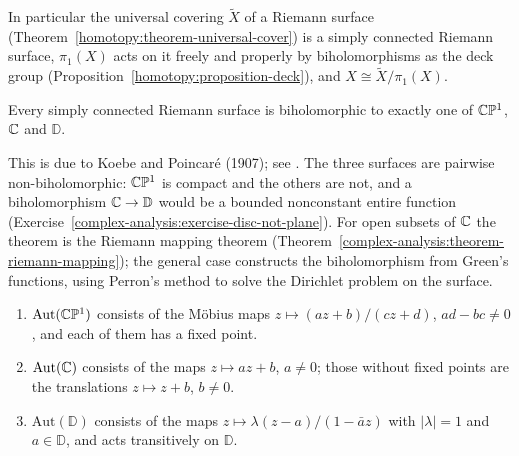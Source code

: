 In particular the universal covering $\widetilde{X}$ of a Riemann surface (Theorem~\ref{homotopy:theorem-universal-cover}) is a simply connected Riemann surface, $\pi_1(X)$ acts
on it freely and properly by biholomorphisms as the deck group (Proposition~\ref{homotopy:proposition-deck}), and $X \cong \widetilde{X}/\pi_1(X)$.

\begin{theorem}\label{complex-manifolds:theorem-uniformisation}
Every simply connected Riemann surface is biholomorphic to exactly one of $\mathbb{C}\mathbb{P}^1$, $\mathbb{C}$ and $\mathbb{D}$.
\end{theorem}

This is due to Koebe and Poincar\'e (1907); see \cite{forster-riemann-surfaces}. The three surfaces are pairwise non-biholomorphic: $\mathbb{C}\mathbb{P}^1$ is compact and the others are not,
and a biholomorphism $\mathbb{C} \to \mathbb{D}$ would be a bounded nonconstant entire function (Exercise~\ref{complex-analysis:exercise-disc-not-plane}). For open subsets of $\mathbb{C}$ the
theorem is the Riemann mapping theorem (Theorem~\ref{complex-analysis:theorem-riemann-mapping}); the general case constructs the biholomorphism from Green's functions, using
Perron's method to solve the Dirichlet problem on the surface.

\begin{lemma}\label{complex-manifolds:lemma-automorphisms}
\begin{enumerate}
\item $\mathrm{Aut}(\mathbb{C}\mathbb{P}^1)$ consists of the M\"obius maps $z \mapsto (az + b)/(cz + d)$, $ad - bc \neq 0$, and each of them has a fixed point.
\item $\mathrm{Aut}(\mathbb{C})$ consists of the maps $z \mapsto az + b$, $a \neq 0$; those without fixed points are the translations $z \mapsto z + b$, $b \neq 0$.
\item $\mathrm{Aut}(\mathbb{D})$ consists of the maps $z \mapsto \lambda(z - a)/(1 - \bar az)$ with $|\lambda| = 1$ and $a \in \mathbb{D}$, and acts transitively on $\mathbb{D}$.
\end{enumerate}
\end{lemma}

